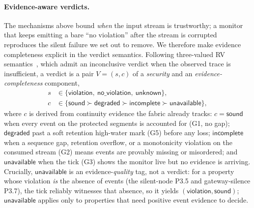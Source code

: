 \documentclass[runningheads]{llncs}
\begin{document}
\paragraph{Evidence-aware verdicts.}
The mechanisms above bound \emph{when} the input stream is trustworthy; a monitor that
keeps emitting a bare ``no violation'' after the stream is corrupted reproduces the silent
failure we set out to remove. We therefore make evidence completeness explicit in the
verdict semantics. Following three-valued RV semantics~\cite{bauer2011rvltl}, which admit
an \textsf{inconclusive} verdict when the observed trace is insufficient, a verdict is a
pair $V=(s,c)$ of a \emph{security} and an \emph{evidence-completeness} component,
\[
\begin{aligned}
  s &\in \{\mathsf{violation},\ \mathsf{no\_violation},\ \mathsf{unknown}\},\\
  c &\in \{\mathsf{sound} \succ \mathsf{degraded} \succ \mathsf{incomplete} \succ \mathsf{unavailable}\},
\end{aligned}
\]
where $c$ is derived from continuity evidence the fabric already tracks:
$c{=}\mathsf{sound}$ when every event on the protected segments is accounted for
(G1, no gap); $\mathsf{degraded}$ past a soft retention high-water mark (G5) before
any loss; $\mathsf{incomplete}$ when a sequence gap, retention overflow, or a
monotonicity violation on the consumed stream (G2) means events are provably missing or
misordered; and $\mathsf{unavailable}$ when the tick (G3) shows the
monitor live but no evidence is arriving. Crucially, $\mathsf{unavailable}$ is an
evidence-\emph{quality} tag, not a verdict: for a property whose violation \emph{is}
the absence of events (the silent-node P3.5 and gateway-silence P3.7), the tick
reliably witnesses that absence, so it yields $(\mathsf{violation},\mathsf{sound})$;
$\mathsf{unavailable}$ applies only to properties that need positive event evidence to
decide.
\end{document}
